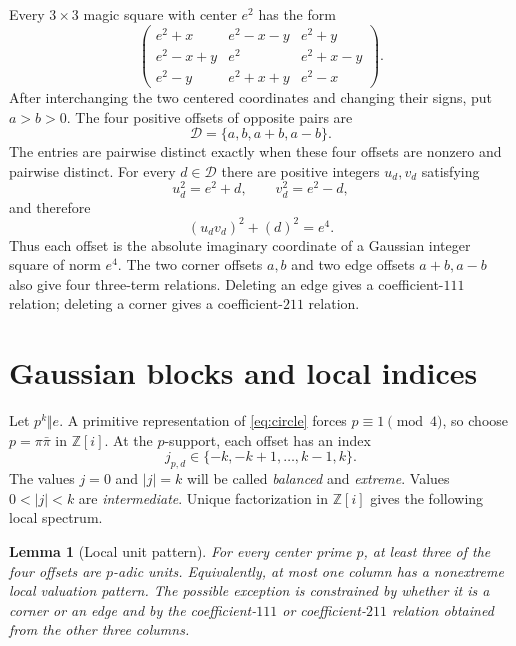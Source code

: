 \documentclass[11pt]{article}
\newtheorem{lemma}[theorem]{Lemma}
\theoremstyle{definition}
\theoremstyle{remark}
\newcommand{\Z}{\mathbb Z}
\begin{document}
Every $3\times3$ magic square with center $e^2$ has the form
\begin{equation}
\begin{pmatrix}
e^2+x & e^2-x-y & e^2+y\\
e^2-x+y & e^2   & e^2+x-y\\
e^2-y & e^2+x+y & e^2-x
\end{pmatrix}.
\label{eq:centered}
\end{equation}
After interchanging the two centered coordinates and changing their signs,
put $a>b>0$.  The four positive offsets of opposite pairs are
\begin{equation}
\mathcal D=\{a,b,a+b,a-b\}.
\label{eq:offsets}
\end{equation}
The entries are pairwise distinct exactly when these four offsets are nonzero
and pairwise distinct.  For every $d\in\mathcal D$ there are positive integers
$u_d,v_d$ satisfying
\begin{equation}
u_d^2=e^2+d,\qquad v_d^2=e^2-d,
\end{equation}
and therefore
\begin{equation}
(u_dv_d)^2+(d)^2=e^4.
\label{eq:circle}
\end{equation}
Thus each offset is the absolute imaginary coordinate of a Gaussian integer
square of norm $e^4$.  The two corner offsets $a,b$ and two edge offsets
$a+b,a-b$ also give four three-term relations.  Deleting an edge gives a
coefficient-$111$ relation; deleting a corner gives a coefficient-$211$
relation.

\section{Gaussian blocks and local indices}

Let $p^k\Vert e$.  A primitive representation of \eqref{eq:circle} forces
$p\equiv1\pmod4$, so choose $p=\pi\bar\pi$ in $\Z[i]$.  At the $p$-support,
each offset has an index
\begin{equation}
j_{p,d}\in\{-k,-k+1,\ldots,k-1,k\}.
\end{equation}
The values $j=0$ and $|j|=k$ will be called \emph{balanced} and
\emph{extreme}.  Values $0<|j|<k$ are \emph{intermediate}.  Unique
factorization in $\Z[i]$ gives the following local spectrum.

\begin{lemma}[Local unit pattern]
For every center prime $p$, at least three of the four offsets are $p$-adic
units.  Equivalently, at most one column has a nonextreme local valuation
pattern.  The possible exception is constrained by whether it is a corner or
an edge and by the coefficient-$111$ or coefficient-$211$ relation obtained
from the other three columns.
\end{lemma}
\end{document}
